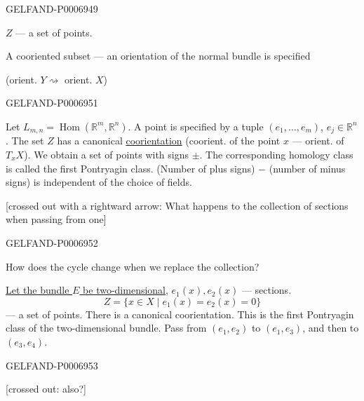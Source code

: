 \begin{GelfandAdjacentEvidence}{GELFAND-P000694}{9}


\(Z\) --- a set of points.

A cooriented subset --- an orientation of the normal bundle is specified

(orient. \(Y\rightsquigarrow\) orient. \(X\))
\end{GelfandAdjacentEvidence}



\begin{GelfandAdjacentEvidence}{GELFAND-P000695}{1}

Let \(L_{m,n}=\operatorname{Hom}(\mathbb R^m,\mathbb R^n)\).
A point is specified by a tuple \((e_1,\ldots,e_m)\), \(e_j\in\mathbb R^n\).
The set \(Z\) has a canonical \underline{coorientation}
(coorient. of the point \(x\) --- orient. of \(T_xX\)).
We obtain a set of points with signs \(\pm\).
The corresponding homology class is called the first Pontryagin class.
(Number of plus signs) \(-\) (number of minus signs) is independent of the choice of fields.

[crossed out with a rightward arrow: What happens to the collection of sections when passing from one]
\end{GelfandAdjacentEvidence}
\begin{GelfandAdjacentEvidence}{GELFAND-P000695}{2}


How does the cycle change when we replace the collection?

\underline{Let the bundle \(E\) be two-dimensional}, \(e_1(x),e_2(x)\) --- sections.
\[
Z=\{x\in X\mid e_1(x)=e_2(x)=0\}
\]
--- a set of points. There is a canonical coorientation.
This is the first Pontryagin class of the two-dimensional bundle.
Pass from \((e_1,e_2)\) to \((e_1,e_3)\), and then to \((e_3,e_4)\).
\end{GelfandAdjacentEvidence}
\begin{GelfandAdjacentEvidence}{GELFAND-P000695}{3}


[crossed out: also?]
\end{GelfandAdjacentEvidence}
